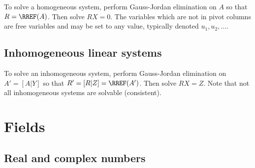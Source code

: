 \begin{procedure}[Solution] To solve a homogeneous system, perform Gauss-Jordan elimination on $A$ so that $R = \RREF(A)$. Then solve $RX = 0$. The variables which are not in pivot columns are free variables and may be set to any value, typically denoted $u_1, u_2, \ldots$.
\end{procedure}

\subsection{Inhomogeneous linear systems}

\begin{procedure}[Solution] To solve an inhomogeneous system, perform Gauss-Jordan elimination on $A' = [A|Y]$ so that $R' = [R|Z] = \RREF(A')$. Then solve $RX = Z$. Note that not all inhomogeneous systems are solvable (consistent).
\end{procedure}

\columnbreak

\section{Fields}

\subsection{Real and complex numbers}

